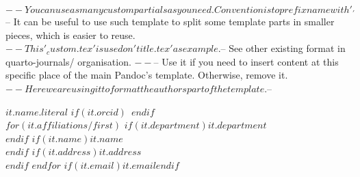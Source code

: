 $-- You can use as many custom partials as you need. Convention is to prefix name with '_'
$-- It can be useful to use such template to split some template parts in smaller pieces, which is easier to reuse. 
$-- This '_custom.tex' is used on 'title.tex' as example.
$-- See other existing format in quarto-journals/ organisation.
$-- %
$-- Use it if you need to insert content at this specific place of the main Pandoc's template. Otherwise, remove it.
$-- Here we are using it to format the authors part of the template.
$-- %

\textbf{$it.name.literal$}%
$if(it.orcid)$~$endif$\\%
$for(it.affiliations/first)$%
    $if(it.department)$$it.department$\\$endif$%
    $if(it.name)$$it.name$\\$endif$%
    $if(it.address)$$it.address$\\$endif$%
$endfor$%
$if(it.email)$\texttt{$it.email$}$endif$